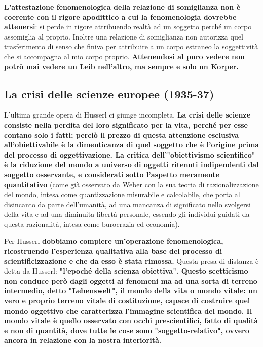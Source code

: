 \textbf{L'attestazione fenomenologica della relazione di
somiglianza non è coerente con il rigore
apodittico a cui la fenomenologia dovrebbe
attenersi}: si perde in rigore attribuendo realtà
ad un soggetto perché un corpo assomiglia
al proprio. Inoltre una relazione di somiglianza
non autorizza quel trasferimento di senso che
finiva per attribuire a un corpo estraneo
la soggettività che si accompagna al mio corpo
proprio. \textbf{Attenendosi al puro vedere non potrò mai
vedere un Leib nell'altro, ma sempre e solo un Korper.}

\subsection{La crisi delle scienze europee (1935-37)}

L'ultima grande opera di Husserl ci giunge incompleta.
\textbf{La crisi delle scienze consiste nella perdita del loro
significato per la vita, perché per esse contano solo
i fatti; perciò il prezzo di questa attenzione esclusiva
all'obiettivabile è la dimenticanza di quel soggetto
che è l'origine prima del processo di oggettivazione.
La critica dell'"obiettivismo scientifico" è la riduzione
del mondo a universo di oggetti ritenuti indipendenti dal soggetto osservante, e considerati sotto
l'aspetto meramente quantitativo} (come già osservato da Weber con la sua teoria di razionalizzazione del mondo, intesa come quantizzazione misurabile e calcolabile, che porta al disincanto da parte dell'umanità,  ad una mancanza di significato nello svolgersi della vita e ad una diminuita libertà personale, essendo gli individui guidati da questa razionalità, intesa come burocrazia ed economia).

Per Husserl \textbf{dobbiamo compiere un'operazione fenomenologica,
ricostruendo l'esperienza qualitativa alla base del
processo di scientificizzazione e che da esso è stata
rimossa.} Questa presa di distanza è detta da Husserl:
\textbf{"l'epoché della scienza obiettiva".
Questo scetticismo non conduce però dagli oggetti
ai fenomeni ma ad una sorta di terreno intermedio,
detto "Lebenswelt", il mondo della vita o mondo
vitale: un vero e proprio terreno vitale di costituzione,
capace di costruire quel mondo oggettivo che caratterizza
l'immagine scientifica del mondo.
Il mondo vitale è quello osservato con occhi
prescientifici, fatto di qualità e non di quantità,
dove tutte le cose sono "soggetto-relativo",
ovvero ancora in relazione con la nostra interiorità.}

